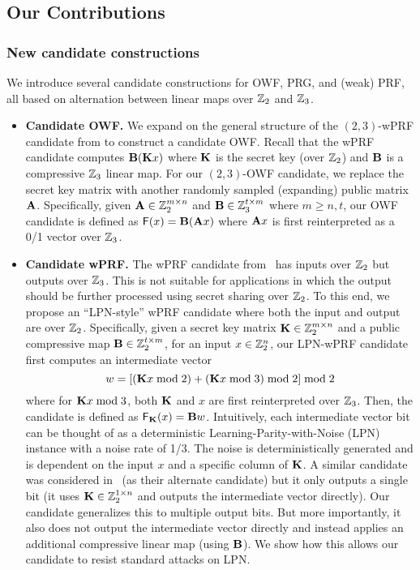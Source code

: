 \subsection{Our Contributions}

\subsubsection{New candidate constructions}
We introduce several candidate constructions for OWF, PRG, and (weak) PRF, all based on alternation between linear maps over $\mathbb{Z}_2$ and $\mathbb{Z}_3$.

\begin{itemize}
    \item \textbf{Candidate OWF.}
    We expand on the general structure of the $(2,3)$-wPRF candidate from \cite{boneh2018-darkmatter} to construct a candidate OWF. Recall that the wPRF candidate computes $\mat{B}(\mat{K}x)$ where $\mat{K}$ is the secret key (over $\mathbb{Z}_2$) and $\mat{B}$ is a compressive $\mathbb{Z}_3$ linear map. For our $(2,3)$-OWF candidate, we replace the secret key matrix with another randomly sampled (expanding) public matrix $\mat{A}$. Specifically, given $\mat{A} \in \Z_2^{m \times n}$ and $\mat{B} \in \Z_3^{t \times m}$ where $m \geq n,t$, our OWF candidate is defined as $\mathsf{F}(x) = \mat{B}(\mat{A}x)$ where $\mat{A}x$ is first reinterpreted as a 0/1 vector over $\mathbb{Z}_3$.

    \item \textbf{Candidate wPRF.}
    The wPRF candidate from~\cite{boneh2018-darkmatter} has inputs over $\mathbb{Z}_2$ but outputs over $\mathbb{Z}_3$. This is not suitable for applications in which the output should be further processed using secret sharing over $\mathbb{Z}_2$. To this end, we propose an ``LPN-style'' wPRF candidate where both the input and output are over $\mathbb{Z}_2$. Specifically, given a secret key matrix $\mat{K} \in \Z_2^{m \times n}$ and a public compressive map $\mat{B} \in \Z_2^{t \times m}$, for an input $x \in \mathbb{Z}_2^n$, our LPN-wPRF candidate first computes an intermediate vector
    \[
        w = [(\mat{K}x \bmod 2) + (\mat{K}x \bmod 3) \bmod 2] \bmod 2
    \]
    where for $\mat{K}x \bmod 3$, both $\mat{K}$ and $x$ are first reinterpreted over $\mathbb{Z}_3$. Then, the candidate is defined as $\mathsf{F}_\mat{K}(x) = \mat{B}w$. Intuitively, each intermediate vector bit can be thought of as a deterministic Learning-Parity-with-Noise (LPN) instance with a noise rate of 1/3. The noise is deterministically generated and is dependent on the input $x$ and a specific column of $\mat{K}$. A similar candidate was considered in~\cite{boneh2018-darkmatter} (as their alternate candidate) but it only outputs a single bit (it uses $\mat{K} \in \Z_2^{1 \times n}$ and outputs the intermediate vector directly). Our candidate generalizes this to multiple output bits. But more importantly, it also does not output the intermediate vector directly and instead applies an additional compressive linear map (using $\mat{B}$). We show how this allows our candidate to resist standard attacks on LPN.



\end{itemize}
